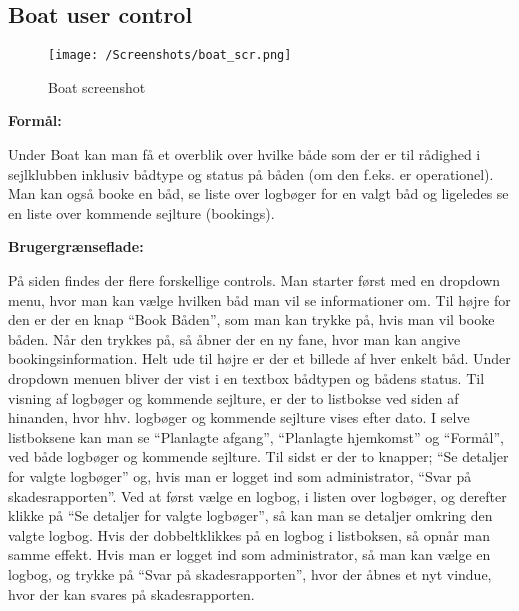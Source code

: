 \subsection{Boat user control}

\begin{wrapfigure}{l}{0.5\textwidth}
    \label{img:boat_scr}
    \vspace{-20pt}
    \begin{center}
        \texttt{[image: /Screenshots/boat\_scr.png]}
    \end{center}
    \vspace{-20pt}
    \caption{Boat screenshot}
    \vspace{-10pt}
\end{wrapfigure}

\textbf{Formål:}

Under Boat kan man få et overblik over hvilke både som der er til rådighed i sejlklubben inklusiv bådtype og status på båden (om den f.eks. er operationel). 
Man kan også booke en båd, se liste over logbøger for en valgt båd og ligeledes se en liste over kommende sejlture (bookings). 

\textbf{Brugergrænseflade:}

På siden findes der flere forskellige controls.
Man starter først med en dropdown menu, hvor man kan vælge hvilken båd man vil se informationer om.
Til højre for den er der en knap ``Book Båden'', som man kan trykke på, hvis man vil booke båden. Når den trykkes på, så åbner der en ny fane, hvor man kan angive bookingsinformation. 
Helt ude til højre er der et billede af hver enkelt båd. 
Under dropdown menuen bliver der vist i en textbox bådtypen og bådens status. 
Til visning af logbøger og kommende sejlture, er der to listbokse ved siden af hinanden, hvor hhv. logbøger og kommende sejlture vises efter dato. 
I selve listboksene kan man se ``Planlagte afgang'', ``Planlagte hjemkomst'' og ``Formål'', ved både logbøger og kommende sejlture. 
Til sidst er der to knapper; ``Se detaljer for valgte logbøger'' og, hvis man er logget ind som administrator, ``Svar på skadesrapporten''. Ved at først vælge en logbog, i listen over logbøger, og derefter klikke på ``Se detaljer for valgte logbøger'', så kan man se detaljer omkring den valgte logbog. 
Hvis der dobbeltklikkes på en logbog i listboksen, så opnår man samme effekt. 
Hvis man er logget ind som administrator, så man kan vælge en logbog, og trykke på ``Svar på skadesrapporten'', hvor der åbnes et nyt vindue, hvor der kan svares på skadesrapporten. 

